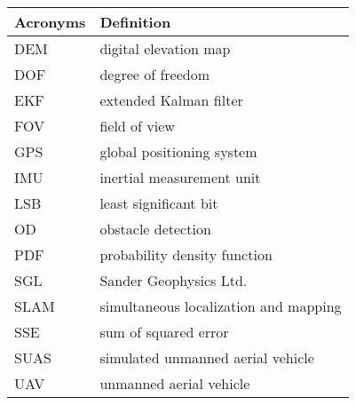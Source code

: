 \begin{center}
\begin{longtable}{ll}
  \hline
  \textbf{Acronyms} & \textbf{Definition} \\
  \hline\hline

DEM     &       digital elevation map\\
DOF     &       degree of freedom \\
EKF     &       extended Kalman filter \\
FOV	&	field of view	\\
GPS     &       global positioning system \\
IMU     &       inertial measurement unit \\
LSB     &       least significant bit  \\
OD      &       obstacle detection \\
PDF     &       probability density function \\
SGL     &       Sander Geophysics Ltd. \\
SLAM    &       simultaneous localization and mapping \\
SSE     &       sum of squared error\\
SUAS    &       simulated unmanned aerial vehicle \\
UAV     &       unmanned aerial vehicle\\
  \hline
\end{longtable}
\end{center}
